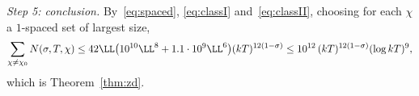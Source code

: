 \emph{Step 5: conclusion.} By~\eqref{eq:spaced}, \eqref{eq:classI} and~\eqref{eq:classII}, choosing for each $\chi$ a $1$-spaced set of largest size,
\[
  \sum_{\chi\ne\chi_0}N(\sigma,T,\chi)\le42\LL\bigl(10^{10}\LL^8+1.1\cdot10^9\LL^6\bigr)(kT)^{12(1-\sigma)}\le10^{12}\,(kT)^{12(1-\sigma)}(\log kT)^9,
\]
which is Theorem~\ref{thm:zd}.
